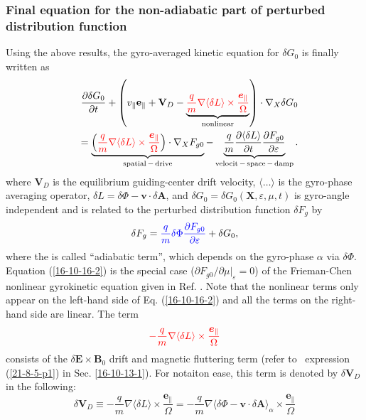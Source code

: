 \documentclass{llncs}
\newcommand{\nobracket}{}
\newcommand{\tmcolor}[2]{{\color{#1}{#2}}}
\newcommand{\tmmathbf}[1]{\ensuremath{\boldsymbol{#1}}}
\newcommand{\tmop}[1]{\ensuremath{\operatorname{#1}}}
\begin{document}
\subsubsection{Final equation for the non-adiabatic part of perturbed
distribution function}

Using the above results, the gyro-averaged kinetic equation for $\delta G_0$
is finally written as
\begin{eqnarray}
  &  & \frac{\partial \delta G_0}{\partial t} + \left( v_{\parallel}
  \mathbf{e}_{\parallel} +\mathbf{V}_D - \underbrace{\tmcolor{red}{\frac{q}{m}
  \nabla \langle \delta L \rangle \times
  \frac{\tmmathbf{e}_{\parallel}}{\Omega}}}_{\tmop{nonlinear}} \right) \cdot
  \nabla_X \delta G_0 \nonumber\\
  &  & = \underbrace{\left( \tmcolor{red}{\frac{q}{m} \nabla \langle \delta L
  \rangle \times \frac{\tmmathbf{e}_{\parallel}}{\Omega}} \right) \cdot
  \nabla_X F_{g 0}}_{\tmop{spatial} - \tmop{drive}} - \underbrace{\frac{q}{m} 
  \frac{\partial \langle \delta L \rangle}{\partial t}  \frac{\partial F_{g
  0}}{\partial \varepsilon}}_{\tmop{velocit} - \tmop{space} - \tmop{damp}} . 
  \label{16-10-16-2}
\end{eqnarray}
where $\mathbf{V}_D$ is the equilibrium guiding-center drift velocity,
$\langle \ldots \rangle$ is the gyro-phase averaging operator, $\delta L =
\delta \Phi -\mathbf{v} \cdot \delta \mathbf{A}$, and $\delta G_0 = \delta G_0
(\mathbf{X}, \varepsilon, \mu, t)$ is gyro-angle independent and is related to
the perturbed distribution function $\delta F_g$ by
\begin{equation}
  \delta F_g = \tmcolor{blue}{\frac{q}{m} \delta \Phi \frac{\partial F_{g
  0}}{\partial \varepsilon}} + \delta G_0,
\end{equation}
where the \tmcolor{blue}{first term} is called ``adiabatic term'', which
depends on the gyro-phase $\alpha$ via $\delta \Phi$. Equation
(\ref{16-10-16-2}) is the special case ($\partial F_{g 0} / \partial \mu
|_{\varepsilon} \nobracket = 0$) of the Frieman-Chen nonlinear gyrokinetic
equation given in Ref. {\cite{frieman1982}}. Note that the nonlinear terms
only appear on the left-hand side of Eq. (\ref{16-10-16-2}) and all the terms
on the right-hand side are linear. The term
\begin{equation}
  \tmcolor{red}{- \frac{q}{m} \nabla \langle \delta L \rangle \times
  \frac{\tmmathbf{e}_{\parallel}}{\Omega}}
\end{equation}
consists of the $\delta \mathbf{E} \times \mathbf{B}_0$ drift and magnetic
fluttering term (refer to \ expression (\ref{21-8-5-p1}) in Sec.
\ref{16-10-13-1}). For notaiton ease, this term is denoted by $\delta
\mathbf{V}_D$ in the following:
\begin{equation}
  \label{19-1-3-1} \delta \mathbf{V}_D \equiv - \frac{q}{m} \nabla \langle
  \delta L \rangle \times \frac{\tmmathbf{e}_{\parallel}}{\Omega} = -
  \frac{q}{m} \nabla \langle \delta \Phi -\mathbf{v} \cdot \delta \mathbf{A}
  \rangle_{\alpha} \times \frac{\mathbf{e}_{\parallel}}{\Omega}
\end{equation}
\end{document}
